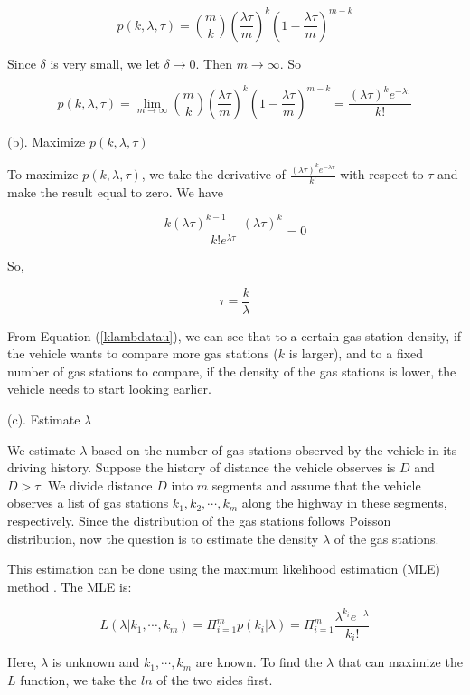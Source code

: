 \documentclass[conference]{IEEEtran}
\theoremstyle{definition}
\begin{document}
\[p(k, \lambda, \tau) = \binom{m}{k}  (\frac{\lambda \tau}{m})^{k}(1-\frac{\lambda \tau}{m})^{m-k} \]

Since $\delta$ is very small, we let $\delta \rightarrow 0$. Then $m \rightarrow \infty$. So

\begin{equation} \label{ppdf}
p(k, \lambda, \tau) =\lim_{m \rightarrow \infty} \binom{m}{k}  (\frac{\lambda \tau}{m})^{k}(1-\frac{\lambda \tau}{m})^{m-k} = \frac{(\lambda \tau)^{k} e^{-\lambda \tau}}{k!}
\end{equation}

\noindent (b). Maximize $p(k, \lambda, \tau)$

To maximize $p(k, \lambda, \tau)$, we take the derivative of $\frac{(\lambda \tau)^{k} e^{-\lambda \tau}}{k!}$ with respect to $\tau$ and make the result equal to zero. We have

\[ \frac{k(\lambda \tau)^{k-1}-(\lambda \tau)^k} {k! e^{\lambda \tau}} =0 \]

So,

\begin{equation}\label{klambdatau}
  \tau = \frac{k}{\lambda}
\end{equation}

From Equation (\ref{klambdatau}), we can see that to a certain gas station density, if the vehicle wants to compare more gas stations ($k$ is larger), and to a fixed number of gas stations to compare, if the density of the gas stations is lower, the vehicle needs to start looking earlier.

\noindent (c). Estimate   $\lambda$

We estimate $\lambda$ based on the number of gas stations observed by the vehicle in its driving history. Suppose the history of distance the vehicle observes is $D$ and $D>\tau$. We divide distance $D$ into $m$ segments and assume that the vehicle observes a list of gas stations $k_1, k_2, \cdots, k_m $ along the highway in these segments, respectively. Since the distribution of the gas stations follows Poisson distribution,  now the question is to estimate the density $\lambda$  of the gas stations.

This estimation can be done using the  maximum likelihood estimation (MLE) method \cite{MLE}.   The MLE is:

\[ L(\lambda|k_1, \cdots, k_m) = \Pi_{i=1}^{m}p(k_i|\lambda) = \Pi_{i=1}^{m}\frac{{\lambda}^{k_{i}}e^{-\lambda}}{k_{i}!} \]

Here, $\lambda$ is unknown and $k_1, \cdots, k_m$ are known. To find the $\lambda$ that can maximize the $L$ function, we take the $ln$ of the two sides first.
\end{document}
